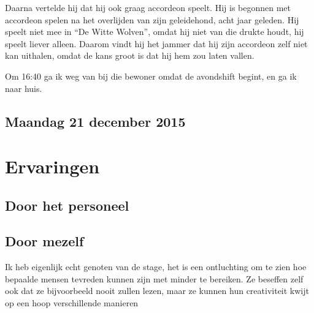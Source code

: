 \documentclass[a4paper,12pt]{article}
\begin{document}
Daarna vertelde hij dat hij ook graag accordeon speelt. Hij is begonnen met accordeon spelen na het overlijden van zijn geleidehond, acht jaar geleden. Hij speelt niet mee in ``De Witte Wolven'', omdat hij niet van die drukte houdt, hij speelt liever alleen. Daarom vindt hij het jammer dat hij zijn accordeon zelf niet kan uithalen, omdat de kans groot is dat hij hem zou laten vallen.

Om 16:40 ga ik weg van bij die bewoner omdat de avondshift begint, en ga ik naar huis.

\subsection{Maandag 21 december 2015}

\section{Ervaringen}

\subsection{Door het personeel}

\subsection{Door mezelf}
Ik heb eigenlijk echt genoten van de stage, het is een ontluchting om te zien hoe bepaalde mensen tevreden kunnen zijn met minder te bereiken. Ze beseffen zelf ook dat ze bijvoorbeeld nooit zullen lezen, maar ze kunnen hun creativiteit kwijt op een hoop verschillende manieren
\end{document}
